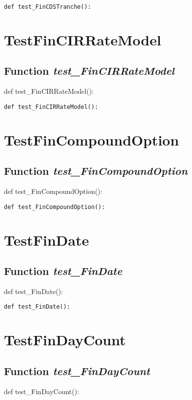 \documentclass[twoside,11pt]{book}
\begin{document}
\begin{lstlisting}
def test_FinCDSTranche():
\end{lstlisting}


\newpage
\section{TestFinCIRRateModel}

\subsection{Function {\it test\_FinCIRRateModel}}
def test\_FinCIRRateModel():

\begin{lstlisting}
def test_FinCIRRateModel():
\end{lstlisting}


\newpage
\section{TestFinCompoundOption}

\subsection{Function {\it test\_FinCompoundOption}}
def test\_FinCompoundOption():

\begin{lstlisting}
def test_FinCompoundOption():
\end{lstlisting}


\newpage
\section{TestFinDate}

\subsection{Function {\it test\_FinDate}}
def test\_FinDate():

\begin{lstlisting}
def test_FinDate():
\end{lstlisting}


\newpage
\section{TestFinDayCount}

\subsection{Function {\it test\_FinDayCount}}
def test\_FinDayCount():
\end{document}
